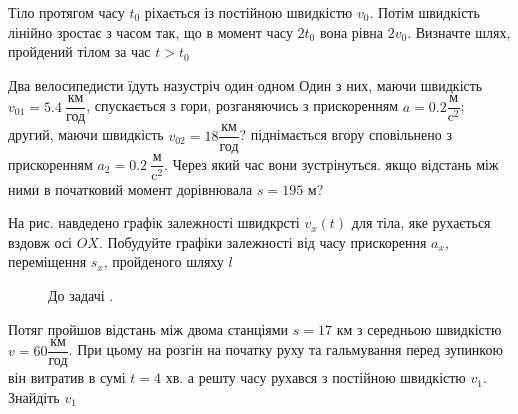 \begin{problem}{4}
	Тіло протягом часу $t_0$ ріхається із постійною швидкістю $v_0$. Потім швидкість лінійно зростає з часом так, що в момент часу $2t_0$ вона рівна $2v_0$. Визначте шлях, пройдений тілом за час $t>t_0$

\end{problem}

\begin{problem}{5}
	Два велосипедисти їдуть назустріч один одном Один з них, маючи швидкість $v_{01} = 5.4~\dfrac{\text{км}}{\text{год}}$, спускається з гори, розганяючись з прискоренням $a = 0.2 \dfrac{\text{м}}{\text{c}^2}$; другий, маючи швидкість $v_{02} = 18 \dfrac{\text{км}}{\text{год}}$? піднімається вгору сповільнено з прискоренням $a_2 = 0.2~\dfrac{\text{м}}{\text{c}^2}$. Через який час вони зустрінуться. якщо відстань між ними в початковий момент дорівнювала $s = 195$ м?
\end{problem}

\begin{problem}{6}
	На рис. навдедено графік залежності швидкрсті $v_x(t)$ для тіла, яке рухається вздовж осі $OX$. Побудуйте графіки залежності від часу прискорення $a_x$, переміщення $s_x$, пройденого шляху $l$
	\begin{figure}[h!]
		\centering
		
		\caption{До задачі .}
		\label{graph}
	\end{figure}
\end{problem}

\newpage
\begin{problem}{9}
	Потяг пройшов відстань між двома станціями $s = 17$ км з середньою швидкістю $v = 60 \dfrac{\text{км}}{\text{год}}$. При цьому на розгін на початку руху та гальмування перед зупинкою він витратив в сумі $t = 4$ хв. а решту часу рухався з постійною швидкістю $v_1$. Знайдіть $v_1$
\end{problem}
